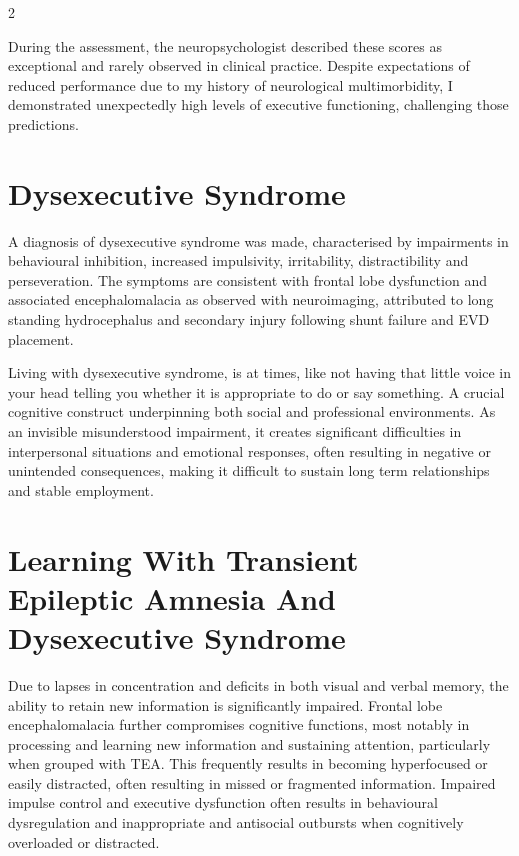\documentclass{article}
\begin{document}
\begin{multicols} {2}
    
During the assessment, the neuropsychologist described these scores as exceptional and rarely observed in clinical practice. Despite expectations of reduced performance due to my history of neurological multimorbidity, I demonstrated unexpectedly high levels of executive functioning, challenging those predictions.

\section*{Dysexecutive Syndrome}
A diagnosis of dysexecutive syndrome was made, characterised by impairments in behavioural inhibition, increased impulsivity, irritability, distractibility and perseveration. The symptoms are consistent with frontal lobe dysfunction and associated encephalomalacia as observed with neuroimaging, attributed to long standing hydrocephalus and secondary injury following shunt failure and EVD placement.

Living with dysexecutive syndrome, is at times, like not having that little voice in your head telling you whether it is appropriate to do or say something. A crucial cognitive construct underpinning both social and professional environments. As an invisible misunderstood impairment, it creates significant difficulties in interpersonal situations and emotional responses, often resulting in negative or unintended consequences, making it difficult to sustain long term relationships and stable employment.

\section*{Learning With Transient \\Epileptic Amnesia And \\Dysexecutive Syndrome}
Due to lapses in concentration and deficits in both visual and verbal memory, the ability to retain new information is significantly impaired. Frontal lobe encephalomalacia further compromises cognitive functions, most notably in processing and learning new information and sustaining attention, particularly when grouped with TEA. This frequently results in becoming hyperfocused or easily distracted, often resulting in missed or fragmented information. Impaired impulse control and executive dysfunction often results in behavioural dysregulation and inappropriate and antisocial outbursts when cognitively overloaded or distracted.


\end{multicols}
\end{document}
